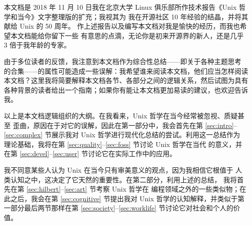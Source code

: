\documentclass[UTF8]{ctexart}
\begin{document}
本文档是 2018 年 11 月 10 日我在北京大学 Linux 俱乐部所作技术报告《Unix
哲学和当今》\nolinebreak{}文字整理版的扩充；我视其为
我在开源社区 10 年经验的结晶，并将其献给 Unix 的 50 周年。
作上述报告以及编写本文档对我是愉快的经历，而我也希望本文档能给你留下一些
有意思的点滴，无论你是初来开源界的新人，还是几乎 3 倍于我年龄的专家。

\newpage
{}

由于多位读者的反馈，我注意到本文档作为综合性总结——即关于各种主题思考
的合集——的属性可能造成一些误解：我希望谁来阅读本文档，他们应当怎样阅读
本文档？这里我将简要解释本文档各节、各部分之间的逻辑关系，然后试图为具有
各种背景的读者给出一个指南；如果你有能让本文档更加易读的建议，也欢迎告诉我。

\begin{wquoting}
\end{wquoting}

以上是本文档逻辑组织的大纲。在我看来，Unix 哲学在当今经常被忽视、质疑甚至
歪曲，原因在于对它的误解，因此在第一部分中，我会首先在第 \ref{sec:intro}--%
\ref{sec:complex} 节展示我对 Unix 哲学进行现代化总结的尝试。利用这一总结作为
理论基础，我将在第 \ref{sec:quality}--\ref{sec:foss} 节讨论 Unix 哲学在当代
的意义，并在第 \ref{sec:devel}--\ref{sec:user} 节讨论它在实际工作中的应用。

我不同意某些人认为 Unix 在当今只有审美意义的观点，因为我相信它根值于
人类认知之中，这决定了它天然的重要性。在第二部分，利用上述的总结，
我将首先在第 \ref{sec:hilbert}--\ref{sec:art} 节考察 Unix 哲学在
编程领域之外的一些类似物；在此之后，我会在第 \ref{sec:cognitive}
节提出我对 Unix 哲学的认知解释，并类似于第一部分最后两节那样在第
\ref{sec:society}--\ref{sec:worklife} 节讨论它对社会和个人的价值。
\end{document}
